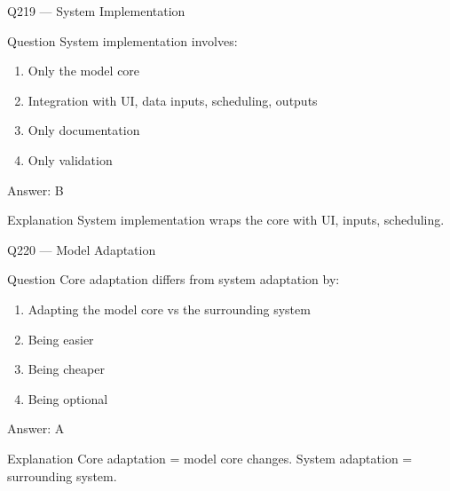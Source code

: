 \documentclass[aspectratio=169,8pt]{beamer}
\begin{document}
								\begin{frame}{Q219 --- System Implementation}
									\begin{block}{Question}
										System implementation involves:
										\begin{enumerate}
											\item Only the model core
											\item Integration with UI, data inputs, scheduling, outputs
											\item Only documentation
											\item Only validation
										\end{enumerate}
									\end{block}
									\begin{exampleblock}{Answer: B}\end{exampleblock}
									\begin{block}{Explanation}
										System implementation wraps the core with UI, inputs, scheduling.
									\end{block}
								\end{frame}
								
								\begin{frame}{Q220 --- Model Adaptation}
									\begin{block}{Question}
										Core adaptation differs from system adaptation by:
										\begin{enumerate}
											\item Adapting the model core vs the surrounding system
											\item Being easier
											\item Being cheaper
											\item Being optional
										\end{enumerate}
									\end{block}
									\begin{exampleblock}{Answer: A}\end{exampleblock}
									\begin{block}{Explanation}
										Core adaptation = model core changes. System adaptation = surrounding system.
									\end{block}
								\end{frame}
								
\end{document}
